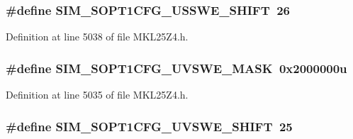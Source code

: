 \subsubsection[{\texorpdfstring{S\+I\+M\+\_\+\+S\+O\+P\+T1\+C\+F\+G\+\_\+\+U\+S\+S\+W\+E\+\_\+\+S\+H\+I\+FT}{SIM_SOPT1CFG_USSWE_SHIFT}}]{\setlength{\rightskip}{0pt plus 5cm}\#define S\+I\+M\+\_\+\+S\+O\+P\+T1\+C\+F\+G\+\_\+\+U\+S\+S\+W\+E\+\_\+\+S\+H\+I\+FT~26}\hypertarget{group___s_i_m___register___masks_ga6984c7260abd4b7caccff970332eb4be}{}\label{group___s_i_m___register___masks_ga6984c7260abd4b7caccff970332eb4be}


Definition at line 5038 of file M\+K\+L25\+Z4.\+h.

\subsubsection[{\texorpdfstring{S\+I\+M\+\_\+\+S\+O\+P\+T1\+C\+F\+G\+\_\+\+U\+V\+S\+W\+E\+\_\+\+M\+A\+SK}{SIM_SOPT1CFG_UVSWE_MASK}}]{\setlength{\rightskip}{0pt plus 5cm}\#define S\+I\+M\+\_\+\+S\+O\+P\+T1\+C\+F\+G\+\_\+\+U\+V\+S\+W\+E\+\_\+\+M\+A\+SK~0x2000000u}\hypertarget{group___s_i_m___register___masks_ga29e593e134a31bed2dbd3673c51cb330}{}\label{group___s_i_m___register___masks_ga29e593e134a31bed2dbd3673c51cb330}


Definition at line 5035 of file M\+K\+L25\+Z4.\+h.

\subsubsection[{\texorpdfstring{S\+I\+M\+\_\+\+S\+O\+P\+T1\+C\+F\+G\+\_\+\+U\+V\+S\+W\+E\+\_\+\+S\+H\+I\+FT}{SIM_SOPT1CFG_UVSWE_SHIFT}}]{\setlength{\rightskip}{0pt plus 5cm}\#define S\+I\+M\+\_\+\+S\+O\+P\+T1\+C\+F\+G\+\_\+\+U\+V\+S\+W\+E\+\_\+\+S\+H\+I\+FT~25}\hypertarget{group___s_i_m___register___masks_ga74d94a9794e03091f54b76a5c18c58b8}{}\label{group___s_i_m___register___masks_ga74d94a9794e03091f54b76a5c18c58b8}


